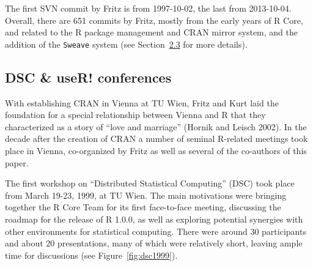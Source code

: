 The first SVN commit by Fritz is from 1997-10-02, the last from
2013-10-04. Overall, there are 651 commits by Fritz, mostly from the
early years of R Core, and related to the R package management and CRAN
mirror system, and the addition of the \texttt{Sweave} system
(see Section~\protect\hyperlink{sec:sweave-reproducibility}{2.3} for more details).

\hypertarget{dsc-user-conferences}{%
\subsection{DSC \& useR! conferences}\label{dsc-user-conferences}}

With establishing CRAN in Vienna at TU Wien, Fritz and Kurt
laid the foundation for a special relationship between Vienna and R that they
characterized as a story of ``love and marriage'' (Hornik and Leisch 2002). In the decade
after the creation of CRAN a number of seminal R-related meetings took place in Vienna,
co-organized by Fritz as well as several of the co-authors of this paper.

The first workshop on ``Distributed Statistical Computing'' (DSC) took place from
March 19-23, 1999, at TU Wien. The main motivations were bringing together the R Core Team
for its first face-to-face meeting, discussing the roadmap for the release of R 1.0.0,
as well as exploring potential synergies with other environments for statistical computing.
There were around 30 participants and about 20 presentations, many of which were
relatively short, leaving ample time for discussions (see Figure~\ref{fig:dsc1999}).

